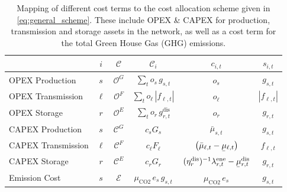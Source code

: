 \documentclass[11pt,twocolumn]{article}
\newcommand{\ubar}[1]{\underaccent{\bar}{#1}}
\newcommand{\state}{s_{i,t}}
\newcommand{\costfactor}{c_{i,t}}
\newcommand{\generation}{g_{s,t}}
\newcommand{\capacitygeneration}{G_{s}}
\newcommand{\operationalpricegeneration}{o_{s}}
\newcommand{\capitalpricegeneration}{c_{s}}
\newcommand{\muuppergeneration}{\bar{\mu}_{s,t}}
\newcommand{\flow}{f_{\ell,t}}
\newcommand{\capacityflow}{F_{\ell}}
\newcommand{\operationalpriceflow}{o_\ell}
\newcommand{\capitalpriceflow}{c_{\ell}}
\newcommand{\mulowerflow}{\ubar{\mu}_{\ell,t}}
\newcommand{\muupperflow}{\bar{\mu}_{\ell,t}}
\newcommand{\storage}{g_{r,t}}
\newcommand{\storagedispatch}{\storage^\text{dis}}
\newcommand{\efficiency}{\eta_{r}}
\newcommand{\efficiencydispatch}{\efficiency^\text{dis}}
\newcommand{\operationalpricestorage}{o_r}
\newcommand{\capitalpricestorage}{c_r}
\newcommand{\capacitystorage}{G_r}
\newcommand{\mulowerstoragedispatch}{\ubar{\mu}_{r,t}^\text{dis}}
\newcommand{\mustateofcharge}{\lambda^\text{ene}_{r,t}}
\newcommand{\emission}{e_{s}}
\newcommand{\emissionprice}{\mu_{\text{CO2}}}
\newcommand{\cost}{\mathcal{C}}
\newcommand{\opexgeneration}{\mathcal{O}^G}
\newcommand{\opexflow}{\mathcal{O}^F}
\newcommand{\opexstorage}{\mathcal{O}^E}
\newcommand{\capexgeneration}{\mathcal{C}^G}
\newcommand{\capexflow}{\mathcal{C}^F}
\newcommand{\capexstorage}{\mathcal{C}^E}
\newcommand{\emissioncost}{\mathcal{E}}
\begin{document}
\begin{table}[t]
    \begin{center}
        \begin{tabular}{l|c|c|c|c|c}
        & $i$ & $\cost$ & $\cost_i$  & $\costfactor$ & $\state$  \\
        \toprule 
        OPEX Production & $s$ & $\opexgeneration$ & $\sum_{t} \operationalpricegeneration \, \generation$   & $\operationalpricegeneration$ & $\generation$ \\  
        OPEX Transmission  & $\ell$ & $\opexflow$ & $\sum_{t} \operationalpriceflow \, |\flow|  $ & $\operationalpriceflow$ & $|\flow|$ \\  
        OPEX Storage & $r$  & $\opexstorage$ & $\sum_{t} \operationalpricestorage \, \storagedispatch$ &  $\operationalpricestorage$ & $\storage$ \\
        \midrule   
        CAPEX Production & $s$ & $\capexgeneration$ & $ \capitalpricegeneration \capacitygeneration$ & $\muuppergeneration$ & $\generation$ \\
        CAPEX Transmission & $\ell$ & $\capexflow$ & $ \capitalpriceflow \capacityflow$ & $\left(\muupperflow - \mulowerflow \right)$ & $\flow$ \\
        CAPEX Storage & $r$ & $\capexstorage$ & $ \capitalpricestorage \capacitystorage$ & $ (\efficiencydispatch )^{-1} \mustateofcharge - \mulowerstoragedispatch$ & $\storage$ \\
        \midrule
        Emission Cost & $s$ & $\emissioncost$ & $ \emissionprice \, \emission \, \generation$ & $\emissionprice \,\emission$ & $\generation$ \\
    \end{tabular}
    \end{center}
    \caption{Mapping of different cost terms to the cost allocation scheme given in \cref{eq:general_scheme}. These include OPEX \& CAPEX for production, transmission and storage assets in the network, as well as a cost term for the total Green House Gas (GHG) emissions.}
    \label{tab:cost_allocation_map}
\end{table}
    
\end{document}
